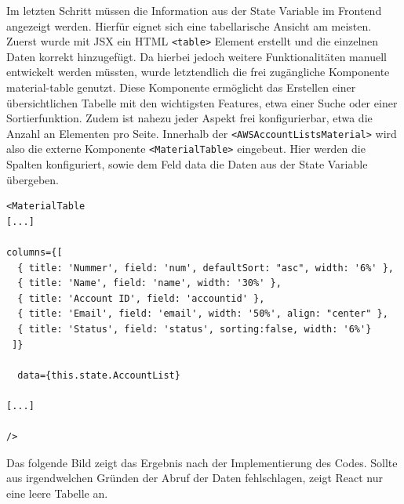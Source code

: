 \clearpage
Im letzten Schritt müssen die Information aus der State Variable im Frontend angezeigt werden.
Hierfür eignet sich eine tabellarische Ansicht am meisten.
Zuerst wurde mit JSX ein HTML \verb+<table>+ Element erstellt und die einzelnen Daten korrekt hinzugefügt.
Da hierbei jedoch weitere Funktionalitäten manuell entwickelt werden müssten, wurde letztendlich die frei zugängliche Komponente \glqq material-table\grqq{} genutzt.
Diese Komponente ermöglicht das Erstellen einer übersichtlichen Tabelle mit den wichtigsten Features, etwa einer Suche oder einer Sortierfunktion.
Zudem ist nahezu jeder Aspekt frei konfigurierbar, etwa die Anzahl an Elementen pro Seite.\cite{MaterialTable}
Innerhalb der \verb+<AWSAccountListsMaterial>+ wird also die externe Komponente \verb+<MaterialTable>+ eingebeut.
Hier werden die Spalten konfiguriert, sowie dem Feld \glqq data\grqq{} die Daten aus der State Variable übergeben.
\\
\begin{lstlisting}[basicstyle=\ttfamily\small, breaklines=true , frame = single, backgroundcolor=\color{flashwhite} ]
<MaterialTable
[...]

columns={[
  { title: 'Nummer', field: 'num', defaultSort: "asc", width: '6%' },
  { title: 'Name', field: 'name', width: '30%' },
  { title: 'Account ID', field: 'accountid' },
  { title: 'Email', field: 'email', width: '50%', align: "center" },
  { title: 'Status', field: 'status', sorting:false, width: '6%'}
 ]}

  data={this.state.AccountList}

[...]

/>
    \end{lstlisting}




 Das folgende Bild zeigt das Ergebnis nach der Implementierung des Codes.
 Sollte aus irgendwelchen Gründen der Abruf der Daten fehlschlagen, zeigt React nur eine leere Tabelle an.

